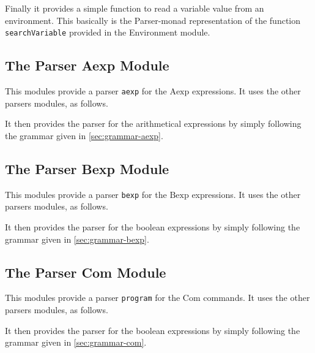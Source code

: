 \documentclass{esposito-documentation}
\begin{document}
Finally it provides a simple function to read a variable value from an
environment.  This basically is the Parser-monad representation of the
function \lstinline|searchVariable| provided in the Environment module.



\subsection{The Parser Aexp Module}


This modules provide a parser \lstinline|aexp| for the $\mathrm{Aexp}$
expressions. It uses the other parsers modules, as follows.



It then provides the parser for the arithmetical expressions by simply following
the grammar given in \autoref{sec:grammar-aexp}.



\subsection{The Parser Bexp Module}


This modules provide a parser \lstinline|bexp| for the $\mathrm{Bexp}$
expressions. It uses the other parsers modules, as follows.



It then provides the parser for the boolean expressions by simply following the
grammar given in \autoref{sec:grammar-bexp}.



\subsection{The Parser Com Module}


This modules provide a parser \lstinline|program| for the $\mathrm{Com}$
commands. It uses the other parsers modules, as follows.



It then provides the parser for the boolean expressions by simply following the
grammar given in \autoref{sec:grammar-com}.
\end{document}
